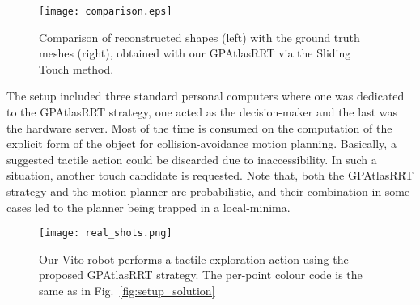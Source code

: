 \begin{figure}[t]
    \centering
    \texttt{[image: comparison.eps]}
    \caption{Comparison of reconstructed shapes (left) with the ground truth meshes (right), obtained with our GPAtlasRRT via the Sliding Touch method.}
    \label{fig:shapecomp}
\end{figure}

The setup included three standard personal computers where one was dedicated to the GPAtlasRRT strategy, one acted as the decision-maker and the last was the hardware server. Most of the time is consumed on the computation of the explicit form of the object for collision-avoidance motion planning. Basically, a suggested tactile action could be discarded due to inaccessibility. In such a situation, another touch candidate is requested. Note that, both the GPAtlasRRT strategy and the motion planner are probabilistic, and their combination in some cases led to the planner being trapped in a local-minima.

\begin{figure}
\centering
  \texttt{[image: real\_shots.png]}
\caption{Our Vito robot performs a tactile exploration action using the proposed GPAtlasRRT strategy. The per-point colour code  is the same as in Fig.~\ref{fig:setup_solution}}
\label{fig:real}
\end{figure}